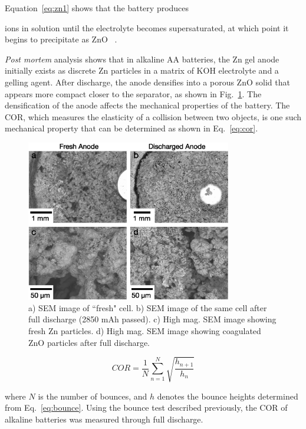 \noindent Equation~\ref{eq:zn1} shows that the battery produces { ions in solution until the electrolyte becomes supersaturated, at which point it begins to precipitate as ZnO ~\cite{linden}.

\textit{Post mortem} analysis shows that in alkaline AA batteries, the Zn gel anode initially exists as discrete Zn particles in a matrix of KOH electrolyte and a gelling agent. After discharge, the anode densifies into a porous ZnO solid that appears more compact closer to the separator, as shown in Fig.~\ref{fig:SEM}. The densification of the anode affects the mechanical properties of the battery. The COR, which measures the elasticity of a collision between two objects, is one such mechanical property that can be determined as shown in Eq.~\ref{eq:cor}.



\begin{figure}[htb]
  \centering
    \includegraphics[width=0.8\textwidth]{ch3-dbb/Images/ZnSEM.eps}
    \caption[SEM images of sectioned fresh and fully discharged alkaline batteries]{a) SEM image of ``fresh" cell. b) SEM image of the same cell after full discharge (2850 mAh passed). c) High mag. SEM image showing fresh Zn particles. d) High mag. SEM image showing coagulated ZnO particles after full discharge.}
    \label{fig:SEM}
\end{figure}

\begin{equation}
COR = \frac{1}{N} \sum\limits_{n=1}^N \sqrt{\frac{h_{n+1}}{h_n}}
\label{eq:cor}
\end{equation}

\noindent where \(N\) is the number of bounces, and \(h\) denotes the bounce heights determined from Eq.~\ref{eq:bounce}. Using the bounce test described previously, the COR of alkaline batteries was measured through full discharge.

}
